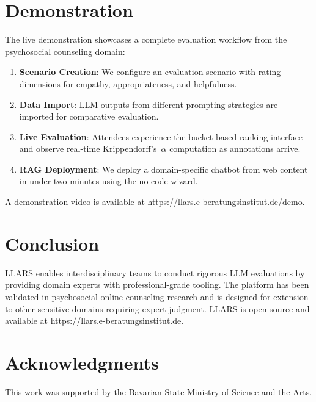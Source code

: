 \documentclass{article}
\begin{document}
\section{Demonstration}

The live demonstration showcases a complete evaluation workflow from the psychosocial counseling domain:

\begin{enumerate}
\item \textbf{Scenario Creation}: We configure an evaluation scenario with rating dimensions for empathy, appropriateness, and helpfulness.
\item \textbf{Data Import}: LLM outputs from different prompting strategies are imported for comparative evaluation.
\item \textbf{Live Evaluation}: Attendees experience the bucket-based ranking interface and observe real-time Krippendorff's~$\alpha$ computation as annotations arrive.
\item \textbf{RAG Deployment}: We deploy a domain-specific chatbot from web content in under two minutes using the no-code wizard.
\end{enumerate}

A demonstration video is available at \url{https://llars.e-beratungsinstitut.de/demo}.

\section{Conclusion}

LLARS enables interdisciplinary teams to conduct rigorous LLM evaluations by providing domain experts with professional-grade tooling.
The platform has been validated in psychosocial online counseling research and is designed for extension to other sensitive domains requiring expert judgment.
LLARS is open-source and available at \url{https://llars.e-beratungsinstitut.de}.

\section*{Acknowledgments}
This work was supported by the Bavarian State Ministry of Science and the Arts.



\end{document}
